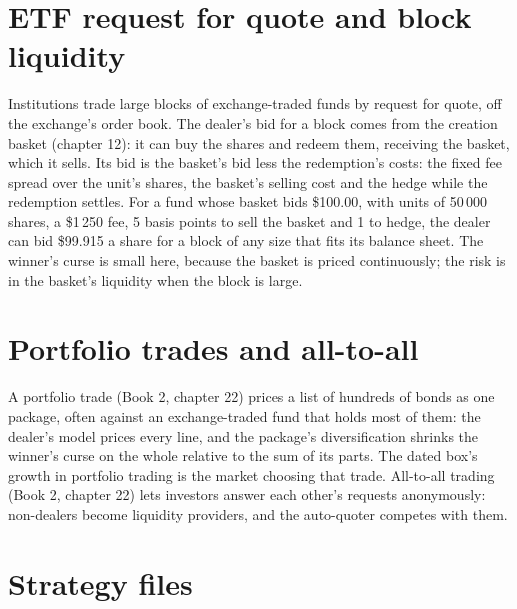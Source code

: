 \section{ETF request for quote and block liquidity}

Institutions trade large blocks of exchange-traded funds by request for quote, off the exchange's order book. The dealer's bid for a block comes
from the creation basket (chapter 12): it can buy the shares and redeem them, receiving the basket, which it sells. Its bid is the basket's bid less
the redemption's costs: the fixed fee spread over the unit's shares, the basket's selling cost and the hedge while the redemption settles. For a fund
whose basket bids \$100.00, with units of 50\,000 shares, a \$1\,250 fee, 5 basis points to sell the basket and 1 to hedge, the dealer can bid
\$99.915 a share for a block of any size that fits its balance sheet. The winner's curse is small here, because the basket is priced continuously;
the risk is in the basket's liquidity when the block is large.

\section{Portfolio trades and all-to-all}

A portfolio trade (Book 2, chapter 22) prices a list of hundreds of bonds as one package, often against an exchange-traded fund that holds most of
them: the dealer's model prices every line, and the package's diversification shrinks the winner's curse on the whole relative to the sum of its
parts. The dated box's growth in portfolio trading is the market choosing that trade. All-to-all trading (Book 2, chapter 22) lets investors answer
each other's requests anonymously: non-dealers become liquidity providers, and the auto-quoter competes with them.

\section{Strategy files}

